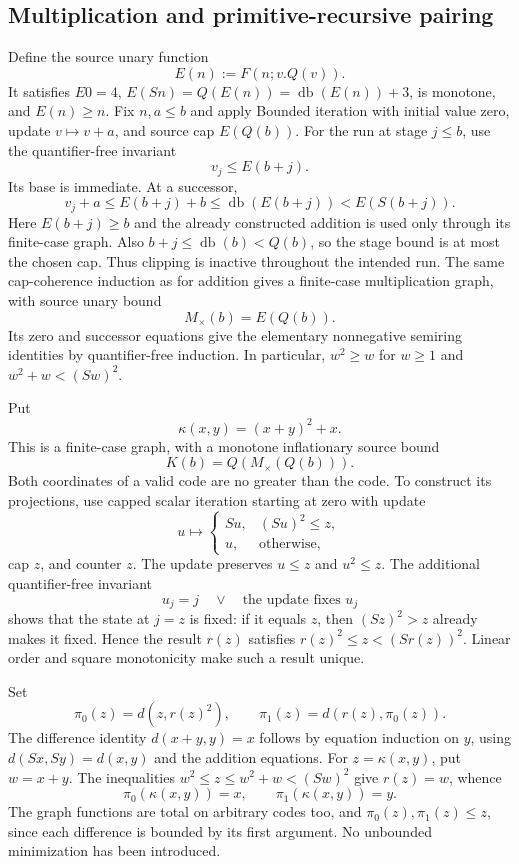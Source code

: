 \documentclass[11pt,letterpaper]{article}
\theoremstyle{definition}\newtheorem{definition}[theorem]{Definition}
\theoremstyle{remark}\newtheorem{remark}[theorem]{Remark}
\begin{document}
\subsection{Multiplication and primitive-recursive pairing}
Define the source unary function
\[
 E(n):=F(n;v.Q(v)).
\]
It satisfies $E0=4$, $E(Sn)=Q(E(n))=\operatorname{db}(E(n))+3$,
is monotone, and $E(n)\ge n$. Fix $n,a\le b$ and apply Bounded
iteration with initial value zero, update $v\mapsto v+a$, and
source cap $E(Q(b))$. For the run at stage $j\le b$, use the
quantifier-free invariant
\[
                         v_j\le E(b+j).
\]
Its base is immediate. At a successor,
\[
 v_j+a\le E(b+j)+b
          \le\operatorname{db}(E(b+j))<E(S(b+j)).
\]
Here $E(b+j)\ge b$ and the already constructed addition is used
only through its finite-case graph. Also
$b+j\le\operatorname{db}(b)<Q(b)$, so the stage bound is at most
the chosen cap. Thus clipping is inactive throughout the intended run.
The same cap-coherence induction as for addition gives a finite-case
multiplication graph, with source unary bound
\[
                         M_\times(b)=E(Q(b)).
\]
Its zero and successor equations give the elementary nonnegative
semiring identities by quantifier-free induction. In particular,
$w^2\ge w$ for $w\ge1$ and
$w^2+w<(Sw)^2$.

Put
\[
                         \kappa(x,y)=(x+y)^2+x.
\]
This is a finite-case graph, with a monotone inflationary source bound
\[
                  K(b)=Q(M_\times(Q(b))).
\]
Both coordinates of a valid code are no greater than the code.
To construct its projections, use capped scalar iteration starting
at zero with update
\[
 u\longmapsto\begin{cases}Su,&(Su)^2\le z,\\u,&\text{otherwise},\end{cases}
\]
cap $z$, and counter $z$. The update preserves $u\le z$ and
$u^2\le z$. The additional quantifier-free invariant
\[
               u_j=j\quad\lor\quad\text{the update fixes }u_j
\]
shows that the state at $j=z$ is fixed: if it equals $z$, then
$(Sz)^2>z$ already makes it fixed. Hence the result $r(z)$ satisfies
$r(z)^2\le z<(Sr(z))^2$. Linear order and square monotonicity make
such a result unique.

Set
\[
 \pi_0(z)=d(z,r(z)^2),\qquad \pi_1(z)=d(r(z),\pi_0(z)).
\]
The difference identity $d(x+y,y)=x$ follows by equation induction
on $y$, using $d(Sx,Sy)=d(x,y)$ and the addition equations.
For $z=\kappa(x,y)$, put $w=x+y$. The inequalities
$w^2\le z\le w^2+w<(Sw)^2$ give $r(z)=w$, whence
\[
               \pi_0(\kappa(x,y))=x,\qquad
               \pi_1(\kappa(x,y))=y.
\]
The graph functions are total on arbitrary codes too, and
$\pi_0(z),\pi_1(z)\le z$, since each difference is bounded by
its first argument. No unbounded minimization has been introduced.
\end{document}
